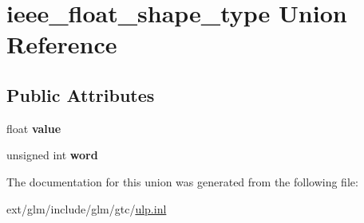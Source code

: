 \hypertarget{unionieee__float__shape__type}{\section{ieee\-\_\-float\-\_\-shape\-\_\-type Union Reference}
\label{unionieee__float__shape__type}
}
\subsection*{Public Attributes}
\begin{DoxyCompactItemize}
\item 
\hypertarget{unionieee__float__shape__type_aa0c47451f1b974421cbb9e2833ddb68e}{float {\bfseries value}}\label{unionieee__float__shape__type_aa0c47451f1b974421cbb9e2833ddb68e}

\item 
\hypertarget{unionieee__float__shape__type_a49230c21acd672d044f38b1abcbd6071}{unsigned int {\bfseries word}}\label{unionieee__float__shape__type_a49230c21acd672d044f38b1abcbd6071}

\end{DoxyCompactItemize}


The documentation for this union was generated from the following file\-:\begin{DoxyCompactItemize}
\item 
ext/glm/include/glm/gtc/\hyperlink{ulp_8inl}{ulp.\-inl}\end{DoxyCompactItemize}
